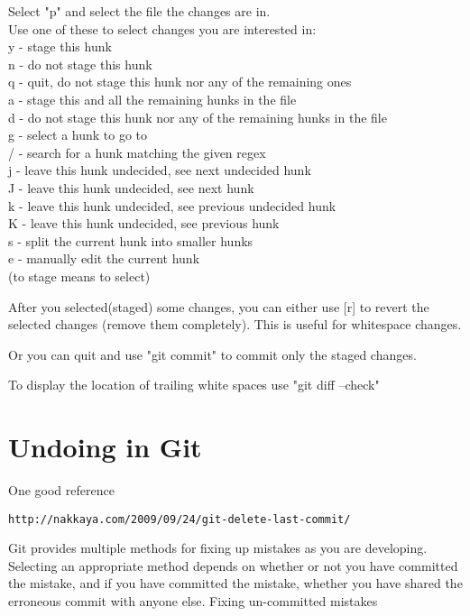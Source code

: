 \documentclass[a4paper,10pt]{article}
\begin{document}
    Select "p" and select the file the changes are in. \\
    Use one of these to select changes you are interested in:\\
    y - stage this hunk\\
    n - do not stage this hunk\\
    q - quit, do not stage this hunk nor any of the remaining ones\\
    a - stage this and all the remaining hunks in the file\\
    d - do not stage this hunk nor any of the remaining hunks in the file\\
    g - select a hunk to go to\\
    / - search for a hunk matching the given regex\\
    j - leave this hunk undecided, see next undecided hunk\\
    J - leave this hunk undecided, see next hunk\\
    k - leave this hunk undecided, see previous undecided hunk\\
    K - leave this hunk undecided, see previous hunk\\
    s - split the current hunk into smaller hunks\\
    e - manually edit the current hunk\\

    (to stage means to select)

    After you selected(staged) some changes, you can either use [r] to revert the selected changes (remove them completely). This is useful for whitespace changes.

    Or you can quit and use "git commit" to commit only the staged changes.

To display the location of trailing white spaces use "git diff --check"    

\section{Undoing in Git}

One good reference

\begin{verbatim}
http://nakkaya.com/2009/09/24/git-delete-last-commit/
\end{verbatim}
Git provides multiple methods for fixing up mistakes as you are developing. Selecting an appropriate method depends on whether or not you have committed the mistake, and if you have committed the mistake, whether you have shared the erroneous commit with anyone else.
Fixing un-committed mistakes
\end{document}
